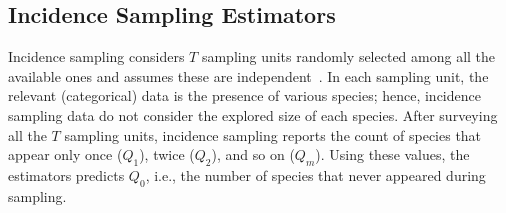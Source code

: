 \documentclass[sigconf,review,anonymous]{acmart}
\begin{document}

\subsection{Incidence Sampling Estimators}
\label{sec:estimators-incidence}

%
Incidence sampling considers $T$ sampling units randomly selected among all
the available ones and assumes these are independent~\cite{chao2016species}.
%
In each sampling unit, the relevant (categorical) data is the presence of various species;
hence, incidence sampling data do not consider the explored size of each species.
%
After surveying all the $T$ sampling units, incidence sampling reports the count of species
that appear only once ($Q_1$), twice ($Q_2$), and so on ($Q_m$).
%
Using these values, the estimators predicts $Q_0$, i.e., the number of species that never
appeared during sampling.
\end{document}
